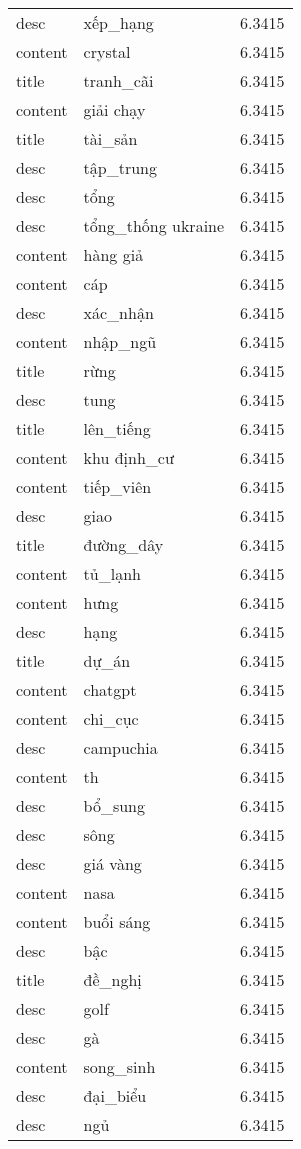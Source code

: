 \documentclass{article}
\begin{document}
\begin{tabular}{lll}
desc & xếp\_hạng & 6.3415\\
content & crystal & 6.3415\\
title & tranh\_cãi & 6.3415\\
content & giải chạy & 6.3415\\
title & tài\_sản & 6.3415\\
desc & tập\_trung & 6.3415\\
desc & tổng & 6.3415\\
desc & tổng\_thống ukraine & 6.3415\\
content & hàng giả & 6.3415\\
content & cáp & 6.3415\\
desc & xác\_nhận & 6.3415\\
content & nhập\_ngũ & 6.3415\\
title & rừng & 6.3415\\
desc & tung & 6.3415\\
title & lên\_tiếng & 6.3415\\
content & khu định\_cư & 6.3415\\
content & tiếp\_viên & 6.3415\\
desc & giao & 6.3415\\
title & đường\_dây & 6.3415\\
content & tủ\_lạnh & 6.3415\\
content & hưng & 6.3415\\
desc & hạng & 6.3415\\
title & dự\_án & 6.3415\\
content & chatgpt & 6.3415\\
content & chi\_cục & 6.3415\\
desc & campuchia & 6.3415\\
content & th & 6.3415\\
desc & bổ\_sung & 6.3415\\
desc & sông & 6.3415\\
desc & giá vàng & 6.3415\\
content & nasa & 6.3415\\
content & buổi sáng & 6.3415\\
desc & bậc & 6.3415\\
title & đề\_nghị & 6.3415\\
desc & golf & 6.3415\\
desc & gà & 6.3415\\
content & song\_sinh & 6.3415\\
desc & đại\_biểu & 6.3415\\
desc & ngủ & 6.3415\\

\end{tabular}
\end{document}
